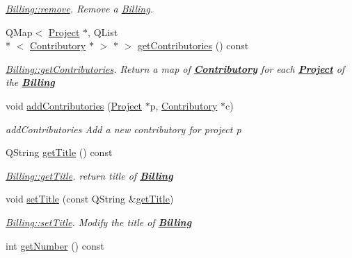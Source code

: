 \begin{DoxyCompactItemize}
\begin{DoxyCompactList}\small\item\em \hyperlink{classBilling_ab5efe0286d292707073b9f1cecd98d6f}{Billing\+::remove}. Remove a \hyperlink{classBilling}{Billing}. \end{DoxyCompactList}\item 
Q\+Map$<$ \hyperlink{classProject}{Project} $\ast$, Q\+List\\*
$<$ \hyperlink{classContributory}{Contributory} $\ast$ $>$ $\ast$ $>$ \hyperlink{classBilling_aba069eef9cf264d90c035e6f83a7cbe8}{get\+Contributories} () const 
\begin{DoxyCompactList}\small\item\em \hyperlink{classBilling_aba069eef9cf264d90c035e6f83a7cbe8}{Billing\+::get\+Contributories}. Return a map of {\bfseries \hyperlink{classContributory}{Contributory}} for each {\bfseries \hyperlink{classProject}{Project}} of the {\bfseries \hyperlink{classBilling}{Billing}} \end{DoxyCompactList}\item 
void \hyperlink{classBilling_a4482a931940eb98c600fa1c67b5e938e}{add\+Contributories} (\hyperlink{classProject}{Project} $\ast$p, \hyperlink{classContributory}{Contributory} $\ast$c)
\begin{DoxyCompactList}\small\item\em add\+Contributories Add a new contributory for project p \end{DoxyCompactList}\item 
Q\+String \hyperlink{classBilling_ad817d4a1dfa011d20b4358a896662f0e}{get\+Title} () const 
\begin{DoxyCompactList}\small\item\em \hyperlink{classBilling_ad817d4a1dfa011d20b4358a896662f0e}{Billing\+::get\+Title}. return title of {\bfseries \hyperlink{classBilling}{Billing}} \end{DoxyCompactList}\item 
void \hyperlink{classBilling_a3e5e98325bd0e9fb4c253ddf07bf66c8}{set\+Title} (const Q\+String \&\hyperlink{classBilling_ad817d4a1dfa011d20b4358a896662f0e}{get\+Title})
\begin{DoxyCompactList}\small\item\em \hyperlink{classBilling_a3e5e98325bd0e9fb4c253ddf07bf66c8}{Billing\+::set\+Title}. Modify the title of {\bfseries \hyperlink{classBilling}{Billing}} \end{DoxyCompactList}\item 
int \hyperlink{classBilling_a23a9446aef6af58bcfa698b76cc24731}{get\+Number} () const 

\end{DoxyCompactItemize}
